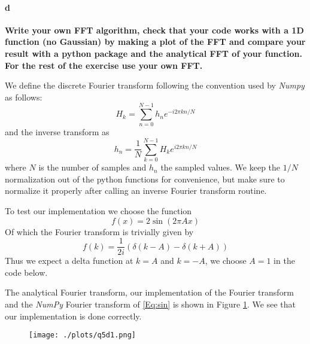 \paragraph{d} \textbf{Write your own FFT algorithm, check that your code works with a 1D function (no Gaussian) by making a plot of the FFT and compare your result with a python package and the analytical FFT of your function. For the rest of the exercise use your own FFT.}

We define the discrete Fourier transform following the convention used by \textit{Numpy} as follows:
\begin{equation}
H_k = \sum_{n=0}^{N-1} h_n e^{-i2\pi k n /N}
\end{equation}
and the inverse transform as 
\begin{equation}
h_n = \frac{1}{N} \sum_{k=0}^{N-1} H_k e^{i2\pi k n/N}
\end{equation}
where $N$ is the number of samples and $h_n$ the sampled values. We keep the $1/N$ normalization out of the python functions for convenience, but make sure to normalize it properly after calling an inverse Fourier transform routine.

To test our implementation we choose the function 
\begin{equation}\label{Eq:sin}
f(x) = 2\sin(2\pi A x) 
\end{equation}
Of which the Fourier transform is trivially given by
\begin{equation}
f(k) = \frac{1}{2i}(\delta(k-A) - \delta(k+A))
\end{equation}
Thus we expect a delta function at $k=A$ and $k=-A$, we choose $A = 1$ in the code below.




The analytical Fourier transform, our implementation of the Fourier transform and the \textit{NumPy} Fourier transform of \ref{Eq:sin} is shown in Figure \ref{fig:fig43}. We see that our implementation is done correctly.

\begin{figure}[ht]\centering
\begin{minipage}[t]{.5\textwidth}
\centering
\texttt{[image: ./plots/q5d1.png]}
\captionsetup{width=0.8\linewidth}
\label{fig:fig43}
\end{minipage}%
\begin{minipage}[t]{.5\textwidth}
\centering
\end{minipage}%
\end{figure}

